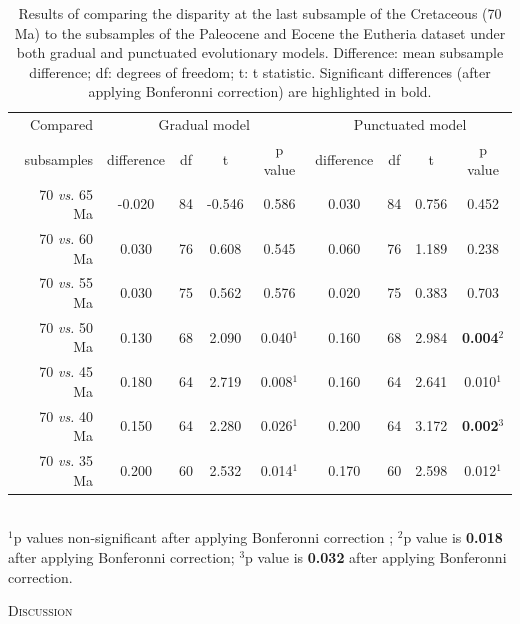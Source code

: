 \documentclass[12pt,letterpaper]{article}
\renewcommand{\section}[1]{%
\bigskip
\begin{center}
\begin{Large}
\normalfont\scshape #1
\medskip
\end{Large}
\end{center}}
\begin{document}
\begin{table}[ht]
\caption{Results of comparing the disparity at the last subsample of the Cretaceous (70 Ma) to the subsamples of the Paleocene and Eocene the Eutheria dataset under both gradual and punctuated evolutionary models. Difference: mean subsample difference; df: degrees of freedom; t: t statistic. Significant differences (after applying Bonferonni correction) are highlighted in bold.}
\label{tab:Tab_beck}
\centering
\begin{tabular}{r|cccc|cccc}
  \hline
  Compared & \multicolumn{4}{c|}{Gradual model} & \multicolumn{4}{c}{Punctuated model} \\
  subsamples & difference & df & t & p value & difference & df & t & p value \\ 
  \hline
  70 \textit{vs.} 65 Ma & -0.020 & 84 & -0.546 & 0.586 & 0.030 & 84 & 0.756 & 0.452 \\ 
  70 \textit{vs.} 60 Ma &  0.030 & 76 & 0.608 & 0.545 & 0.060 & 76 & 1.189 & 0.238 \\ 
  70 \textit{vs.} 55 Ma &  0.030 & 75 & 0.562 & 0.576 & 0.020 & 75 & 0.383 & 0.703 \\ 
  70 \textit{vs.} 50 Ma &  0.130 & 68 & 2.090 & 0.040$^1$ & 0.160 & 68 & 2.984 & \textbf{0.004}$^2$ \\ 
  70 \textit{vs.} 45 Ma &  0.180 & 64 & 2.719 & 0.008$^1$ & 0.160 & 64 & 2.641 & 0.010$^1$ \\ 
  70 \textit{vs.} 40 Ma &  0.150 & 64 & 2.280 & 0.026$^1$ & 0.200 & 64 & 3.172 & \textbf{0.002}$^3$ \\ 
  70 \textit{vs.} 35 Ma &  0.200 & 60 & 2.532 & 0.014$^1$ & 0.170 & 60 & 2.598 & 0.012$^1$ \\ 
   \hline
\end{tabular} \\
   $^1$p values non-significant after applying Bonferonni correction \citep{holm1979simple};
   $^2$p value is \textbf{0.018} after applying Bonferonni correction;
   $^3$p value is \textbf{0.032} after applying Bonferonni correction.
\end{table}


%
%

\section{Discussion}
\end{document}
